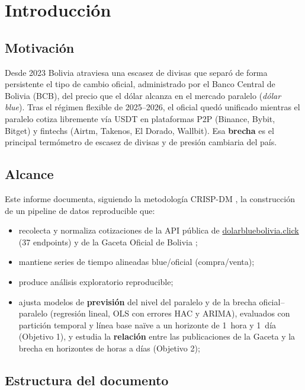 \section*{Introducción}
\label{sec:introduccion}

\subsection{Motivación}

Desde 2023 Bolivia atraviesa una escasez de divisas que separó de forma
persistente el tipo de cambio oficial, administrado por el Banco Central de
Bolivia (BCB), del precio que el dólar alcanza en el mercado paralelo
(\emph{dólar blue}). Tras el régimen flexible de 2025--2026, el oficial quedó
unificado mientras el paralelo cotiza libremente vía USDT en plataformas P2P
(Binance, Bybit, Bitget) y fintechs (Airtm, Takenos, El Dorado,
Wallbit). Esa \textbf{brecha} es el
principal termómetro de escasez de divisas y de presión cambiaria del país.

\subsection{Alcance}

Este informe documenta, siguiendo la metodología CRISP-DM
\cite{chapman2000crisp}, la construcción de un pipeline de
datos reproducible que:

\begin{itemize}
  \item recolecta y normaliza cotizaciones de la API pública de
        \href{https://www.dolarbluebolivia.click}{dolarbluebolivia.click}
        (37 endpoints) \cite{dolarblue2026api} y de la Gaceta Oficial de
        Bolivia \cite{gaceta2026};
  \item mantiene series de tiempo alineadas blue/oficial (compra/venta);
  \item produce análisis exploratorio reproducible;
  \item ajusta modelos de \textbf{previsión} del nivel del paralelo y de la
        brecha oficial--paralelo (regresión lineal, OLS con errores HAC y
        ARIMA), evaluados con partición temporal y línea base naïve a un
        horizonte de 1~hora y 1~día (Objetivo 1), y estudia la \textbf{relación}
        entre las publicaciones de la Gaceta y la brecha en horizontes de
        horas a días (Objetivo 2);
\end{itemize}

\subsection{Estructura del documento}

